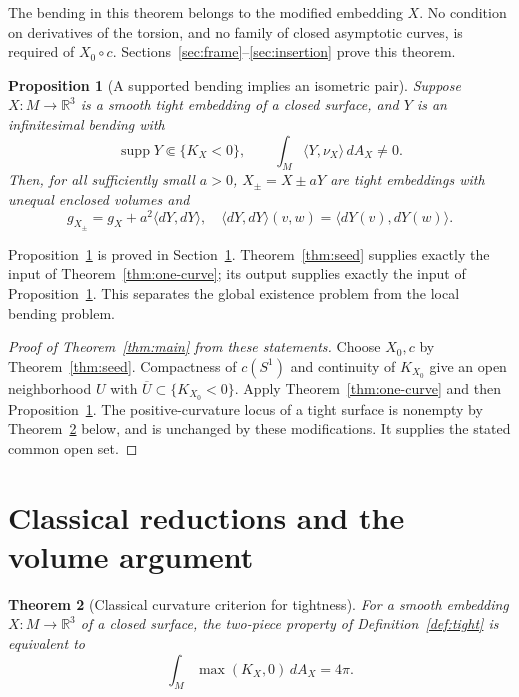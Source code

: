 \documentclass[11pt]{amsart}
\newtheorem{theorem}{Theorem}[section]
\newtheorem{proposition}[theorem]{Proposition}
\theoremstyle{definition}
\newcommand{\R}{\mathbb R}
\DeclareMathOperator{\supp}{supp}
\begin{document}
The bending in this theorem belongs to the modified embedding $X$.
No condition on derivatives of the torsion, and no family of closed
asymptotic curves, is required of $X_0\circ c$.
Sections~\ref{sec:frame}--\ref{sec:insertion} prove this theorem.

\begin{proposition}[A supported bending implies an isometric pair]
\label{prop:pair}
Suppose $X:M\to\R^3$ is a smooth tight embedding of a closed surface,
and $Y$ is an infinitesimal bending with
\[
 \supp Y\Subset\{K_X<0\},\qquad
 \int_M\langle Y,\nu_X\rangle\,dA_X\ne0.
\]
Then, for all sufficiently small $a>0$, $X_\pm=X\pm aY$ are tight
embeddings with unequal enclosed volumes and
\begin{equation}\label{eq:exact-metric}
 g_{X_\pm}=g_X+a^2\langle dY,dY\rangle,
 \quad
 \langle dY,dY\rangle(v,w)=\langle dY(v),dY(w)\rangle.
\end{equation}
\end{proposition}

Proposition~\ref{prop:pair} is proved in Section~\ref{sec:reductions}.
Theorem~\ref{thm:seed} supplies exactly the input of
Theorem~\ref{thm:one-curve}; its output supplies exactly the input of
Proposition~\ref{prop:pair}. This separates the global existence
problem from the local bending problem.

\begin{proof}[Proof of Theorem~\ref{thm:main} from these statements]
Choose $X_0,c$ by Theorem~\ref{thm:seed}. Compactness of $c(S^1)$
and continuity of $K_{X_0}$ give an open neighborhood $U$ with
$\overline U\subset\{K_{X_0}<0\}$. Apply
Theorem~\ref{thm:one-curve} and then Proposition~\ref{prop:pair}.
The positive-curvature locus of a tight surface is nonempty by
Theorem~\ref{thm:tightness} below, and is unchanged by these
modifications. It supplies the stated common open set.
\end{proof}

\section{Classical reductions and the volume argument}
\label{sec:reductions}

\begin{theorem}[Classical curvature criterion for tightness]
\label{thm:tightness}
For a smooth embedding $X:M\to\R^3$ of a closed surface, the two-piece
property of Definition~\ref{def:tight} is equivalent to
\begin{equation}\label{eq:tightness}
 \int_M\max(K_X,0)\,dA_X=4\pi.
\end{equation}
\end{theorem}
\end{document}
